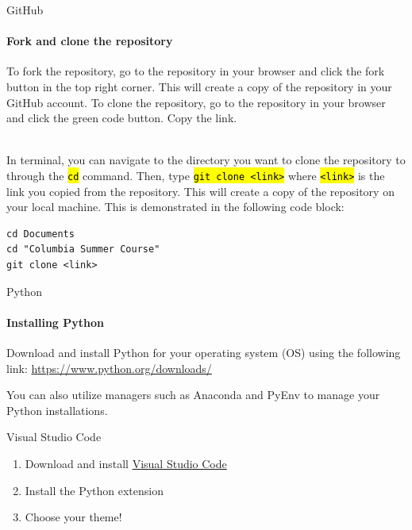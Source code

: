 \documentclass[
    aspectratio=169, 
    usepdftitle=false, 
    xcolor={dvipsnames},
    hyperref={
        colorlinks,
        linkcolor=black,
        urlcolor=blue}
    ]{beamer}
\let\OldTexttt\texttt
\renewcommand{\texttt}[1]{\OldTexttt{\hl{#1}}}%
\begin{document}
\begin{frame}[fragile]{GitHub}
    \framesubtitle{Fork and clone the repository}

    To fork the repository, go to the repository in your browser and click the fork button in the top right corner. This will create a copy of the repository in your GitHub account. To clone the repository, go to the repository in your browser and click the green code button. Copy the link.\\~\

    In terminal, you can navigate to the directory you want to clone the repository to through the \texttt{cd} command. Then, type \texttt{git clone <link>} where \texttt{<link>} is the link you copied from the repository. This will create a copy of the repository on your local machine. This is demonstrated in the following code block:

    \begin{lstlisting}
cd Documents
cd "Columbia Summer Course"
git clone <link>
    \end{lstlisting}
\end{frame}

\begin{frame}{Python}
    \framesubtitle{Installing Python}
    
    Download and install Python for your operating system (OS) using the following link: \url{https://www.python.org/downloads/} 

    You can also utilize managers such as Anaconda and PyEnv to manage your Python installations.
\end{frame}

\begin{frame}{Visual Studio Code}
    \begin{enumerate}
        \item Download and install \href{https://code.visualstudio.com/download}{Visual Studio Code}
        \item Install the Python extension
        \item Choose your theme! 
    \end{enumerate}
\end{frame}
\end{document}
